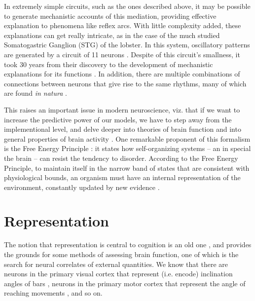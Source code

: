 In extremely simple circuits, such as the ones described above, it may be possible to generate mechanistic accounts of this mediation, providing effective explanation to phenomena like reflex arcs. With little complexity added, these explanations can get really intricate, as in the case of the much studied Somatogastric Ganglion (STG) of the lobster. In this system, oscillatory patterns are generated by a circuit of 11 neurons \cite{selverston2009neural}. Despite of this circuit's smallness, it took 30 years from their discovery to the development of mechanistic explanations for its functions \cite{bal1988pyloric, selverston2009neural}. In addition, there are multiple combinations of connections between neurons that give rise to the same rhythms, many of which are found \textit{in natura} \cite{prinz2004similar}. 


This raises an important issue in modern neuroscience, viz. that if we want to increase the predictive power of our models, we have to step away from the implementional level, and delve deeper into theories of brain function and into general properties of brain activity \cite{gerstner2012theory}. One remarkable proponent of this formalism is the Free Energy Principle \cite{friston2009free}: it states how self-organizing systems -- an in special the brain -- can resist the tendency to disorder. According to the Free Energy Principle, to maintain itself in the narrow band of states that are consistent with physiological bounds, an organism must have an internal representation of the environment, constantly updated by new evidence \cite{friston2009free}.

\section{Representation}
\label{sec:representation}
The notion that representation is central to cognition is an old one \cite[p.~134-140]{rosch1991embodied}, and provides the grounds for some methods of assessing brain function, one of which is the search for neural correlates of external quantities. We know that there are neurons in the primary visual cortex that represent (i.e. encode) inclination angles of bars \cite[p.~13]{dayan2001theoretical}, neurons in the primary motor cortex that represent the angle of reaching movements \cite[p.~14]{dayan2001theoretical}, and so on.

